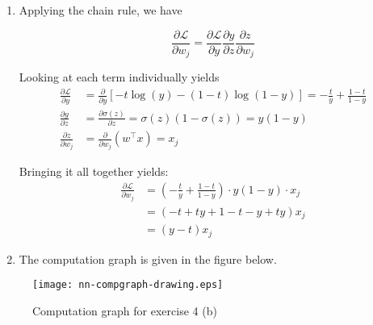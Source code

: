\documentclass[
  letterpaper,
  DIV=11,
  numbers=noendperiod]{scrartcl}
\begin{document}
\begin{enumerate}
\def\labelenumi{(\alph{enumi})}
\item
  Applying the chain rule, we have

  \[ \frac{\partial \mathcal{L}}{\partial w_j} = \frac{\partial \mathcal{L}}{\partial y} \frac{\partial y}{\partial z} \frac{\partial z}{\partial w_j} \]

  Looking at each term individually yields \[
  \begin{aligned}
  \frac{\partial \mathcal{L}}{\partial y} 
    &= \frac{\partial}{\partial y} [-t \log(y) - (1 - t) \log(1 - y)] 
    = - \frac{t}{y} + \frac{1 - t}{1 - y}\\
  \frac{\partial y}{\partial z} 
    &= \frac{\partial \sigma(z)}{\partial z} 
    = \sigma(z) (1 - \sigma(z))
    = y (1 - y)\\
  \frac{\partial z}{\partial w_j} 
    &= \frac{\partial}{\partial w_j} (w^\top x) = x_j
  \end{aligned}
  \]

  Bringing it all together yields: \[
  \begin{aligned}
  \frac{\partial \mathcal{L}}{\partial w_j} 
    &= \left( - \frac{t}{y} + \frac{1 - t}{1 - y} \right) \cdot y (1 - y) \cdot x_j \\
    &= (-t + ty + 1 - t - y + ty) x_j \\
    &= (y - t) x_j
  \end{aligned}
  \]
\item
  The computation graph is given in the figure below.
\end{enumerate}

\begin{figure}[H]

{\centering \texttt{[image: nn-compgraph-drawing.eps]}

}

\caption{Computation graph for exercise 4 (b)}

\end{figure}%
\end{document}
